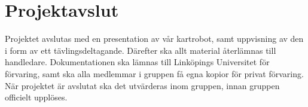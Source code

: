 \documentclass[a4paper,11pt]{article}
\begin{document}
    \section{Projektavslut}
    Projektet avslutas med en presentation av vår kartrobot, samt uppvisning av den i form av ett tävlingsdeltagande. Därefter ska allt material återlämnas till handledare. Dokumentationen ska lämnas till Linköpings Universitet för förvaring, samt ska alla medlemmar i gruppen få egna kopior för privat förvaring. När projektet är avslutat ska det utvärderas inom gruppen, innan gruppen officielt upplöses.
    
    \begin{appendices}
    \end{appendices}
    \clearpage
    \printbibliography
\end{document}
